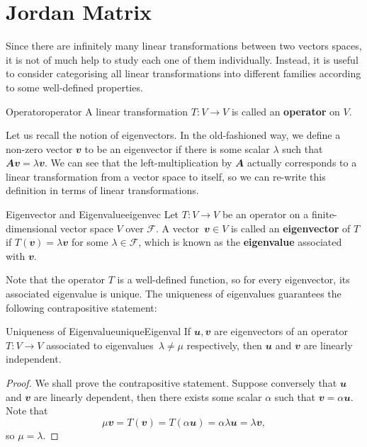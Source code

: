 \documentclass[math, code]{amznotes}
\theoremstyle{remark}
\begin{document}
\section{Jordan Matrix}
Since there are infinitely many linear transformations between two vectors spaces, it is not of much help to study each one of them individually. Instead, it is useful to consider categorising all linear transformations into different families according to some well-defined properties.
\begin{dfnbox}{Operator}{operator}
    A linear transformation $T \colon V \to V$ is called an {\color{red} \textbf{operator}} on $V$.
\end{dfnbox}
Let us recall the notion of eigenvectors. In the old-fashioned way, we define a non-zero vector $\mathbfit{v}$ to be an eigenvector if there is some scalar $\lambda$ such that $\mathbfit{Av} = \lambda\mathbfit{v}$. We can see that the left-multiplication by $\mathbfit{A}$ actually corresponds to a linear transformation from a vector space to itself, so we can re-write this definition in terms of linear transformations.
\begin{dfnbox}{Eigenvector and Eigenvalue}{eigenvec}
    Let $T \colon V \to V$ be an operator on a finite-dimensional vector space $V$ over $\mathcal{F}$. A vector~$\mathbfit{v} \in V$ is called an {\color{red} \textbf{eigenvector}} of $T$ if $T(\mathbfit{v}) = \lambda\mathbfit{v}$ for some $\lambda \in \mathcal{F}$, which is known as the {\color{red} \textbf{eigenvalue}} associated with $\mathbfit{v}$.
\end{dfnbox}
Note that the operator $T$ is a well-defined function, so for every eigenvector, its associated eigenvalue is unique. The uniqueness of eigenvalues guarantees the following contrapositive statement:
\begin{probox}{Uniqueness of Eigenvalue}{uniqueEigenval}
    If $\mathbfit{u}, \mathbfit{v}$ are eigenvectors of an operator $T \colon V \to V$ associated to eigenvalues~$\lambda \neq \mu$ respectively, then $\mathbfit{u}$ and $\mathbfit{v}$ are linearly independent.
    \tcblower
    \begin{proof}
        We shall prove the contrapositive statement. Suppose conversely that $\mathbfit{u}$ and $\mathbfit{v}$ are linearly dependent, then there exists some scalar $\alpha$ such that $\mathbfit{v} = \alpha\mathbfit{u}$. Note that 
        \begin{equation*}
            \mu\mathbfit{v} = T(\mathbfit{v}) = T(\alpha\mathbfit{u}) = \alpha\lambda\mathbfit{u} = \lambda\mathbfit{v},
        \end{equation*}
        so $\mu = \lambda$.
    \end{proof}
\end{probox}
\end{document}
